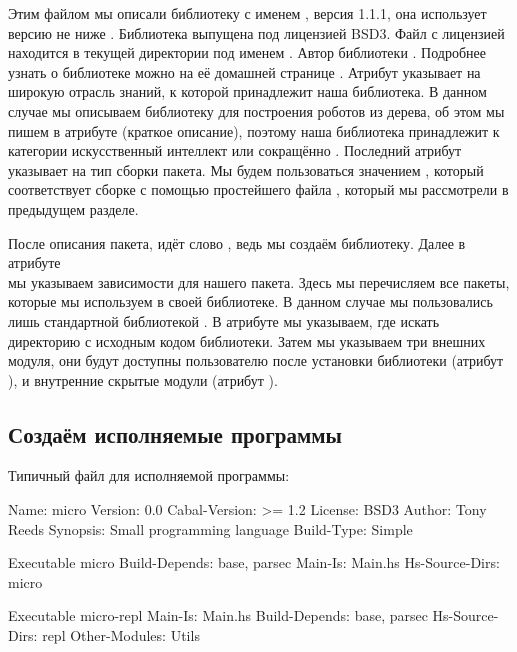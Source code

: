 Этим файлом мы описали библиотеку с именем , версия 1.1.1,
она использует версию  не ниже . Библиотека выпущена
под лицензией BSD3. Файл с лицензией находится в текущей директории под
именем . Автор библиотеки . Подробнее
узнать о библиотеке можно на её домашней странице
. Атрибут  указывает
на широкую отрасль знаний, к которой принадлежит наша библиотека. В
данном случае мы описываем библиотеку для построения роботов из дерева,
об этом мы пишем в атрибуте  (краткое описание), поэтому
наша библиотека принадлежит к категории искусственный интеллект или
сокращённо . Последний атрибут  указывает на тип
сборки пакета. Мы будем пользоваться значением , который
соответствует сборке с помощью простейшего файла , который
мы рассмотрели в предыдущем разделе.

После описания пакета, идёт слово , ведь мы создаём
библиотеку. Далее в атрибуте \\мы указываем
зависимости для нашего пакета. Здесь мы перечисляем все пакеты, которые
мы используем в своей библиотеке. В данном случае мы пользовались лишь
стандартной библиотекой . В атрибуте  мы
указываем, где искать директорию с исходным кодом библиотеки. Затем мы
указываем три внешних модуля, они будут доступны пользователю после
установки библиотеки (атрибут ), и внутренние
скрытые модули (атрибут ).

\subsection{Создаём исполняемые программы}

Типичный файл  для исполняемой программы:


\begin{code}
Name:           micro
Version:        0.0
Cabal-Version:  >= 1.2
License:        BSD3
Author:         Tony Reeds
Synopsis:       Small programming language
Build-Type:     Simple

Executable micro
  Build-Depends:  base, parsec
  Main-Is:        Main.hs
  Hs-Source-Dirs: micro

Executable micro-repl
  Main-Is:        Main.hs
  Build-Depends:  base, parsec
  Hs-Source-Dirs: repl
  Other-Modules:  Utils
\end{code}

